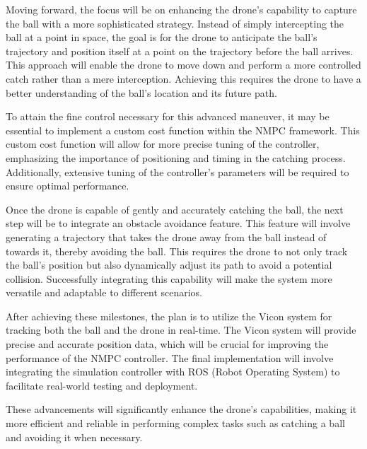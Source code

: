 \documentclass{UoNMCHA}
\numberwithin{equation}{section}
\begin{document}
Moving forward, the focus will be on enhancing the drone's capability to capture the ball with a more sophisticated strategy. Instead of simply intercepting the ball at a point in space, the goal is for the drone to anticipate the ball's trajectory and position itself at a point on the trajectory before the ball arrives. This approach will enable the drone to move down and perform a more controlled catch rather than a mere interception. Achieving this requires the drone to have a better understanding of the ball's location and its future path.

To attain the fine control necessary for this advanced maneuver, it may be essential to implement a custom cost function within the NMPC framework. This custom cost function will allow for more precise tuning of the controller, emphasizing the importance of positioning and timing in the catching process. Additionally, extensive tuning of the controller's parameters will be required to ensure optimal performance.

Once the drone is capable of gently and accurately catching the ball, the next step will be to integrate an obstacle avoidance feature. This feature will involve generating a trajectory that takes the drone away from the ball instead of towards it, thereby avoiding the ball. This requires the drone to not only track the ball's position but also dynamically adjust its path to avoid a potential collision. Successfully integrating this capability will make the system more versatile and adaptable to different scenarios.

After achieving these milestones, the plan is to utilize the Vicon system for tracking both the ball and the drone in real-time. The Vicon system will provide precise and accurate position data, which will be crucial for improving the performance of the NMPC controller. The final implementation will involve integrating the simulation controller with ROS (Robot Operating System) to facilitate real-world testing and deployment.

These advancements will significantly enhance the drone's capabilities, making it more efficient and reliable in performing complex tasks such as catching a ball and avoiding it when necessary.

\newpage


\appendix
\newpage
\end{document}
